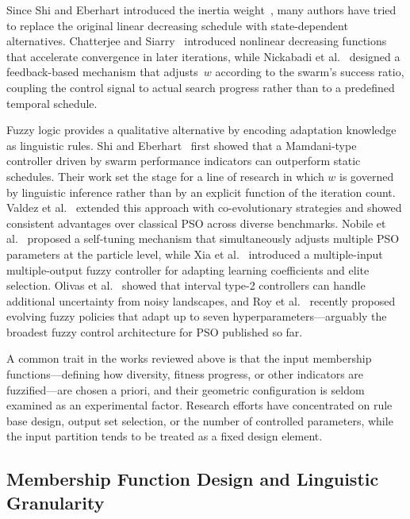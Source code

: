 \documentclass[conference]{IEEEtran}
\begin{document}
Since Shi and Eberhart introduced the inertia weight~\cite{shi1998modified}, many authors have tried to replace the original linear decreasing schedule with state-dependent alternatives. Chatterjee and Siarry~\cite{chatterjee2006nonlinear} introduced nonlinear decreasing functions that accelerate convergence in later iterations, while Nickabadi et al.~\cite{nickabadi2011novel} designed a feedback-based mechanism that adjusts~$w$ according to the swarm's success ratio, coupling the control signal to actual search progress rather than to a predefined temporal schedule.

Fuzzy logic provides a qualitative alternative by encoding adaptation knowledge as linguistic rules. Shi and Eberhart~\cite{shi2001fuzzy} first showed that a Mamdani-type controller driven by swarm performance indicators can outperform static schedules. Their work set the stage for a line of research in which $w$ is governed by linguistic inference rather than by an explicit function of the iteration count. Valdez et al.~\cite{valdez2017comparative} extended this approach with co-evolutionary strategies and showed consistent advantages over classical PSO across diverse benchmarks. Nobile et al.~\cite{nobile2018fuzzy} proposed a self-tuning mechanism that simultaneously adjusts multiple PSO parameters at the particle level, while Xia et al.~\cite{xia2022particle} introduced a multiple-input multiple-output fuzzy controller for adapting learning coefficients and elite selection. Olivas et al.~\cite{olivas2014comparative} showed that interval type-2 controllers can handle additional uncertainty from noisy landscapes, and Roy et al.~\cite{roy2024hyperparameter} recently proposed evolving fuzzy policies that adapt up to seven hyperparameters---arguably the broadest fuzzy control architecture for PSO published so far.

A common trait in the works reviewed above is that the input membership functions---defining how diversity, fitness progress, or other indicators are fuzzified---are chosen a priori, and their geometric configuration is seldom examined as an experimental factor. Research efforts have concentrated on rule base design, output set selection, or the number of controlled parameters, while the input partition tends to be treated as a fixed design element.

\subsection{Membership Function Design and Linguistic Granularity}
\label{subsec:rw_mf_design}
\end{document}
